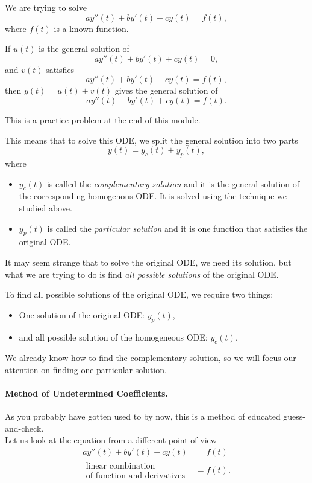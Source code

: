 We are trying to solve
$$
a y''(t)  + b y'(t) + c y(t) = f(t),
$$
where $f(t)$ is a known function. \\


\begin{graybox}
If $u(t)$ is the general solution of
$$
ay''(t)+by'(t)+cy(t) = 0,
$$
and $v(t)$ satisfies
$$
ay''(t)+by'(t)+cy(t) = f(t),
$$
then $y(t) = u(t) + v(t)$ gives the general solution of
$$
ay''(t)+by'(t)+cy(t) = f(t).
$$

This is a practice problem at the end of this module.
\end{graybox}


This means that to solve this ODE, we split the general solution into two parts
$$
y(t) = y_c(t) + y_p(t),
$$
where
\begin{itemize}
	\item $y_c(t)$ is called the \emph{complementary solution} and it is the general solution of the corresponding homogenous ODE. It is solved using the technique we studied above.
	\item $y_p(t)$ is called the \emph{particular solution} and it is one function that satisfies the original ODE.
\end{itemize}

\begin{important}
It may seem strange that to solve the original ODE, we need its solution, but what we are trying to do is find \emph{all possible solutions} of the original ODE.

To find all possible solutions of the original ODE, we require two things:
\begin{itemize}
	\item One solution of the original ODE:  $y_p(t)$,
	\item and all possible solution of the homogeneous ODE: $y_c(t)$.
\end{itemize}
\end{important}


We already know how to find the complementary solution, so we will focus our attention on finding one particular solution.

\paragraph{\color{cyan}Method of Undetermined Coefficients.} As you probably have gotten used to by now, this is a method of educated guess-and-check. \\

Let us look at the equation from a different point-of-view
\begin{align*}
a y''(t) + by'(t) + cy(t) & = f(t) \\
\substack{\text{linear combination}\\\text{of function and derivatives}} & = f(t).
\end{align*}

